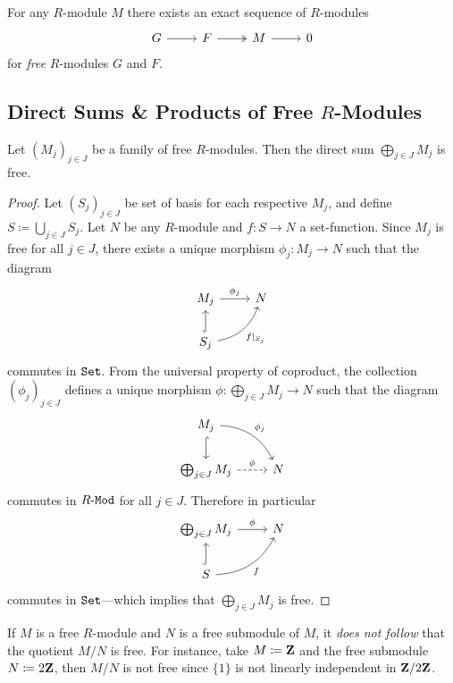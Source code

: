 \begin{corollary}
\label{cor:any-module-is-quotient-of-free-module}
For any \(R\)-module \(M\) there exists an exact sequence of \(R\)-modules
\[
\begin{tikzcd}
G \ar[r] &F \ar[r, two heads] &M \ar[r] &0
\end{tikzcd}
\]
for \emph{free} \(R\)-modules \(G\) and \(F\).
\end{corollary}

\subsection{Direct Sums \& Products of Free \texorpdfstring{\(R\)}{R}-Modules}

\begin{proposition}
\label{prop:direct-sum-mod-free}
Let \((M_j)_{j \in J}\) be a family of free \(R\)-modules. Then the direct sum
\(\bigoplus_{j \in J} M_j\) is free.
\end{proposition}

\begin{proof}
Let \((S_j)_{j \in J}\) be set of basis for each respective \(M_j\), and define
\(S \coloneq \bigcup_{j \in J} S_j\). Let \(N\) be any \(R\)-module and \(f: S
\to N\) a set-function. Since \(M_j\) is free for all \(j \in J\), there exists
a unique morphism \(\phi_j: M_j \to N\) such that the diagram
\[
\begin{tikzcd}
M_j \ar[r, "\phi_j"] &N \\
S_j \ar[u, hook] \ar[ru, "f|_{S_j}"', bend right]
\end{tikzcd}
\]
commutes in \({\texttt{Set}}\). From the universal property of coproduct, the collection
\((\phi_j)_{j \in J}\) defines a unique morphism \(\phi: \bigoplus_{j \in J} M_j
\to N\) such that the diagram
\[
\begin{tikzcd}
M_j \ar[d, hook] \ar[rd, bend left, "\phi_j"] & \\
\bigoplus_{j \in J} M_j \ar[r, dashed, "\phi"] &N
\end{tikzcd}
\]
commutes in \({R\text{-}\texttt{Mod}}\) for all \(j \in J\). Therefore in particular
\[
\begin{tikzcd}
\bigoplus_{j \in J} M_j \ar[r, "\phi"] & N \\
S \ar[u, hook] \ar[ru, bend right, "f"'] &
\end{tikzcd}
\]
commutes in \({\texttt{Set}}\)---which implies that \(\bigoplus_{j \in J} M_j\) is free.
\end{proof}

\begin{remark}
\label{rem:M/N-not-free}
If \(M\) is a free \(R\)-module and \(N\) is a free submodule of \(M\), it
\emph{does not follow} that the quotient \(M/N\) is free. For instance, take \(M
\coloneq \mathbf{Z}\) and the free submodule \(N \coloneq 2 \mathbf{Z}\), then \(M/N\) is not
free since \(\{1\}\) is not linearly independent in \(\mathbf{Z}/2\mathbf{Z}\).
\end{remark}

